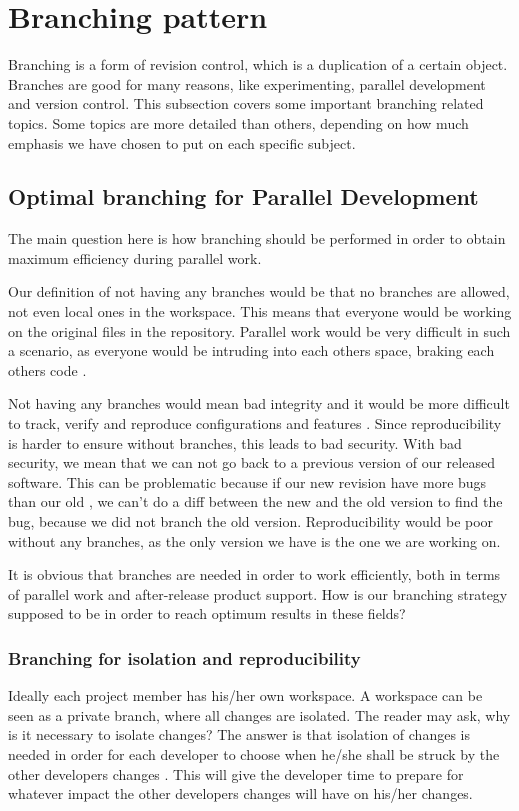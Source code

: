 \documentclass[10pt]{article}
\begin{document}
\section{Branching pattern}
Branching is a form of revision control, which is a duplication of a certain object. Branches are good for many reasons, like experimenting, parallel development and version control. This subsection covers some important branching related topics. Some topics are more detailed than others, depending on how much emphasis we have chosen to put on each specific subject.
\subsection{Optimal branching for Parallel Development}
The main question here is how branching should be performed in order to obtain maximum efficiency during parallel work.

\noindent Our definition of not having any branches would be that no branches are allowed, not even local ones in the workspace. This means that everyone would be working on the original files in the repository. Parallel work would be very difficult in such a scenario, as everyone would be intruding into each others space, braking each others code \cite{Appleton}.

\noindent Not having any branches would mean bad integrity and it would be more difficult to track, verify and reproduce configurations and features \cite{Appleton}. Since reproducibility is harder to ensure without branches, this leads to bad security. With bad security, we mean that we can not go back to a previous version of our released software. This can be problematic because if our new revision have more bugs than our old \cite{Babich}, we can't do a diff between the new and the old version to find the bug, because we did not branch the old version. Reproducibility would be poor without any branches, as the only version we have is the one we are working on.

\noindent It is obvious that branches are needed in order to work efficiently, both in terms of parallel work and after-release product support. How is our branching strategy supposed to be in order to reach optimum results in these fields?

\subsubsection{Branching for isolation and reproducibility}
\noindent Ideally each project member has his/her own workspace. A workspace can be seen as a private branch, where all changes are isolated. The reader may ask, why is it necessary to isolate changes? The answer is that isolation of changes is needed in order for each developer to choose when he/she shall be struck by the other developers changes \cite{Appleton}. This will give the developer time to prepare for whatever impact the other developers changes will have on his/her changes.
\end{document}
